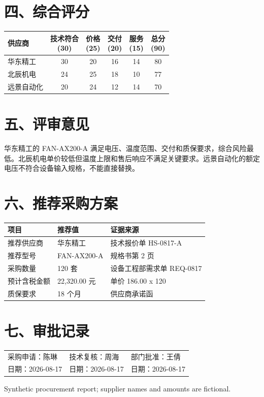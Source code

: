 \documentclass[10.5pt,a4paper]{article}
\begin{document}
\section*{四、综合评分}
\small\begin{tabular}{|p{28mm}|c|c|c|c|c|}\hline
\rowcolor{blue!12} 供应商 & \shortstack{技术符合\\(30)} & \shortstack{价格\\(25)} & \shortstack{交付\\(20)} & \shortstack{服务\\(15)} & \shortstack{总分\\(90)}\\\hline
华东精工 & 30 & 20 & 16 & 14 & 80\\\hline
北辰机电 & 24 & 25 & 18 & 10 & 77\\\hline
远景自动化 & 20 & 24 & 12 & 14 & 70\\\hline
\end{tabular}
\section*{五、评审意见}
华东精工的 FAN-AX200-A 满足电压、温度范围、交付和质保要求，综合风险最低。北辰机电单价较低但温度上限和售后响应不满足关键要求。远景自动化的额定电压不符合设备输入规格，不能直接替换。
\section*{六、推荐采购方案}
\begin{tabular}{|p{42mm}|p{46mm}|p{50mm}|}\hline
\rowcolor{gray!15} 项目 & 推荐值 & 证据来源\\\hline
推荐供应商 & 华东精工 & 技术报价单 HS-0817-A\\\hline
推荐型号 & FAN-AX200-A & 规格书第 2 页\\\hline
采购数量 & 120 套 & 设备工程部需求单 REQ-0817\\\hline
预计含税金额 & 22,320.00 元 & 单价 186.00 x 120\\\hline
质保要求 & 18 个月 & 供应商承诺函\\\hline
\end{tabular}
\section*{七、审批记录}
\begin{tabular}{p{52mm}p{52mm}p{52mm}}
采购申请：陈琳 & 技术复核：周海 & 部门批准：王倩\\[15mm]
日期：2026-08-17 & 日期：2026-08-17 & 日期：2026-08-17
\end{tabular}
\vfill\color{gray}\small Synthetic procurement report; supplier names and amounts are fictional.
\end{document}
